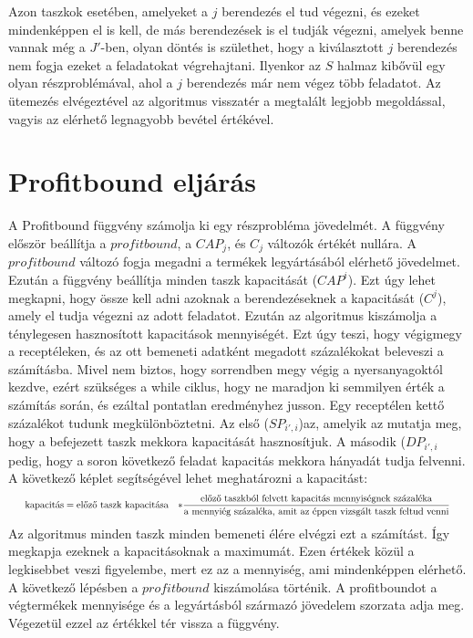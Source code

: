 \newpage
Azon taszkok esetében, amelyeket a $j$ berendezés el tud végezni, és ezeket mindenképpen el is kell, de más berendezések is el tudják végezni, amelyek benne vannak még a $J'$-ben, olyan döntés is születhet, hogy a kiválasztott $j$ berendezés nem fogja ezeket a feladatokat végrehajtani. Ilyenkor az $S$ halmaz kibővül egy olyan részproblémával, ahol a $j$ berendezés már nem végez több feladatot. Az ütemezés elvégeztével az algoritmus visszatér a megtalált legjobb megoldással, vagyis az elérhető legnagyobb bevétel értékével.

\section{Profitbound eljárás}
A Profitbound függvény számolja ki egy részprobléma jövedelmét. A függvény először beállítja a $profitbound$, a $CAP_{j}$, és $C_{j}$ változók értékét nullára. A $profitbound$ változó fogja megadni a termékek legyártásából elérhető jövedelmet. Ezután a függvény beállítja minden taszk kapacitását ($CAP^{i}$). Ezt úgy lehet megkapni, hogy össze kell adni azoknak a berendezéseknek a kapacitását ($C^{j}$), amely el tudja végezni az adott feladatot. Ezután az algoritmus kiszámolja a ténylegesen hasznosított kapacitások mennyiségét. Ezt úgy teszi, hogy végigmegy a receptéleken, és az ott bemeneti adatként megadott százalékokat beleveszi a számításba. Mivel nem biztos, hogy sorrendben megy végig a nyersanyagoktól kezdve, ezért szükséges a while ciklus, hogy ne maradjon ki semmilyen érték a számítás során, és ezáltal pontatlan eredményhez jusson. Egy receptélen kettő százalékot tudunk megkülönböztetni. Az első ($SP_{i',i}$)az, amelyik az mutatja meg, hogy a befejezett taszk mekkora kapacitását hasznosítjuk. A második ($DP_{i',i}$ pedig, hogy a soron következő feladat kapacitás mekkora hányadát tudja felvenni. A következő képlet segítségével lehet meghatározni a kapacitást:
\begin{gather}
\scalebox{0.75}{$
\begin{align*}
\text{kapacitás}&= \text{előző taszk kapacitása}&*\frac{\text{előző taszkból felvett kapacitás mennyiségnek százaléka}}{\text{a mennyiég százaléka, amit az éppen vizsgált taszk feltud venni}}
\end{align*}$}	
\end{gather}
Az algoritmus minden taszk minden bemeneti élére elvégzi ezt a számítást. Így megkapja ezeknek a kapacitásoknak a maximumát. Ezen értékek közül a legkisebbet veszi figyelembe, mert ez az a mennyiség, ami mindenképpen elérhető. A következő lépésben a $profitbound$ kiszámolása történik. A profitboundot a végtermékek mennyisége és a legyártásból származó jövedelem szorzata adja meg. Végezetül ezzel az értékkel tér vissza a függvény.

